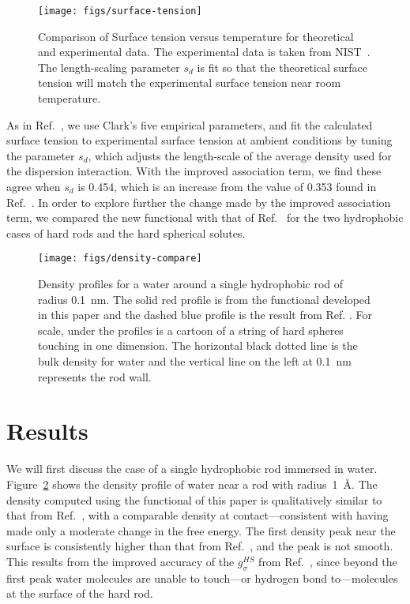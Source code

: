 \documentclass[twocolumn,amsmath,amssymb,prl]{revtex4-1}
\newcommand\lscale{\ensuremath{s_d}}
\begin{document}
\begin{figure}
\begin{center}
\texttt{[image: figs/surface-tension]}
\end{center}
\caption{Comparison of Surface tension versus temperature for
  theoretical and experimental data. The experimental data is taken
  from NIST~\cite{nistwater}.  The length-scaling parameter $\lscale$
  is fit so that the theoretical surface tension will match the
  experimental surface tension near room temperature.}
\label{fig:surface-tension}
\end{figure}

As in Ref.~, we use Clark's five
empirical parameters, and fit the calculated surface tension to
experimental surface tension at ambient conditions by tuning the
parameter $\lscale$, which adjusts the length-scale of the average
density used for the dispersion interaction.  With the improved
association term, we find these agree when $\lscale$ is 0.454, which
is an increase from the value of 0.353 found in
Ref.~.  In order to explore further the
change made by the improved association term, we compared the new
functional with that of Ref.~ for the two
hydrophobic cases of hard rods and the hard spherical solutes.

\begin{figure}
\begin{center}
\texttt{[image: figs/density-compare]}
\end{center}
\caption{ Density profiles for a water around a single hydrophobic rod
  of radius 0.1~nm. The solid red profile is from the functional
  developed in this paper and the dashed blue profile is the result
  from Ref. \cite{hughes2013classical}.  For scale, under the profiles
  is a cartoon of a string of hard spheres touching in one
  dimension. The horizontal black dotted line is the bulk density for
  water and the vertical line on the left at 0.1~nm represents the
  rod wall.}
\label{fig:density-single-rod}
\end{figure}

\section{Results}

We will first discuss the case of a single hydrophobic rod immersed in
water. Figure~\ref{fig:density-single-rod} shows the density profile
of water near a rod with radius~1~\AA.  The density computed using the functional of this
paper is qualitatively similar to that from
Ref.~, with a comparable density at
contact---consistent with having made only a moderate change in the
free energy.  The first density peak near the surface is consistently
higher than that from Ref.~, and the peak
is not smooth.  This results from the improved accuracy of the
$g_\sigma^\textit{HS}$ from Ref.~, since beyond the
first peak water molecules are unable to touch---or hydrogen bond
to---molecules at the surface of the hard rod.
\end{document}
